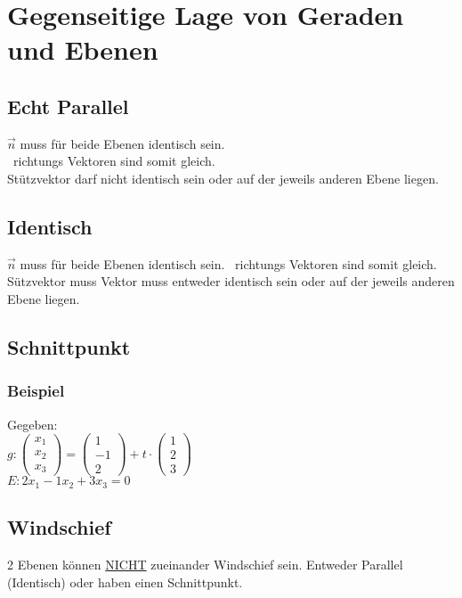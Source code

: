 
\section{Gegenseitige Lage von Geraden und Ebenen}
\subsection{Echt Parallel}
$\vec{n}$ muss für beide Ebenen identisch sein. \\
\textrightarrow\ richtungs Vektoren sind somit gleich. \\
Stützvektor darf nicht identisch sein oder auf der jeweils anderen Ebene liegen.

\subsection{Identisch}
$\vec{n}$ muss für beide Ebenen identisch sein.
\textrightarrow\ richtungs Vektoren sind somit gleich. \\
Sützvektor muss Vektor muss entweder identisch sein oder auf der jeweils anderen Ebene liegen.

\subsection{Schnittpunkt}
\subsubsection{Beispiel}
Gegeben: \\
$
g:
\begin{pmatrix}
    x_1 \\ x_2 \\ x_3
\end{pmatrix}
=
\begin{pmatrix}
    1 \\ -1 \\ 2
\end{pmatrix}
+ t \cdot
\begin{pmatrix}
    1 \\ 2 \\ 3
\end{pmatrix}
$
\\
$
E: 2x_1 - 1x_2 + 3x_3 = 0
$

\subsection{Windschief}
2 Ebenen können \underline{NICHT} zueinander Windschief sein.
Entweder Parallel (Identisch) oder haben einen Schnittpunkt.
